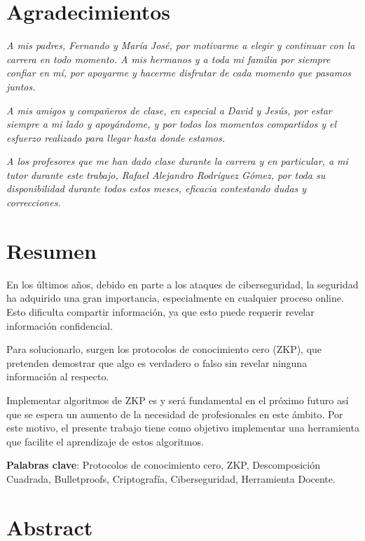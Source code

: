 \chapter*{Agradecimientos}

\begin{flushleft}
    \textit{A mis padres, Fernando y María José, por motivarme a elegir y continuar con la carrera en todo momento. A mis hermanos y a toda mi familia por siempre confiar en mí, por apoyarme y hacerme disfrutar de cada momento que pasamos juntos.}

    \textit{A mis amigos y compañeros de clase, en especial a David y Jesús, por estar siempre a mi lado y apoyándome, y por todos los momentos compartidos y el esfuerzo realizado para llegar hasta donde estamos.}

    \textit{A los profesores que me han dado clase durante la carrera y en particular, a mi tutor durante este trabajo, Rafael Alejandro Rodríguez Gómez, por toda su disponibilidad durante todos estos meses, eficacia contestando dudas y correcciones.}
\end{flushleft}

\blankpage

\chapter*{Resumen}

En los últimos años, debido en parte a los ataques de ciberseguridad, la seguridad ha adquirido una gran importancia, especialmente en cualquier proceso online. Esto dificulta compartir información, ya que esto puede requerir revelar información confidencial.

Para solucionarlo, surgen los protocolos de conocimiento cero (ZKP), que pretenden demostrar que algo es verdadero o falso sin revelar ninguna información al respecto.

Implementar algoritmos de ZKP es y será fundamental en el próximo futuro así que se espera un aumento de la necesidad de profesionales en este ámbito. Por este motivo, el presente trabajo tiene como objetivo implementar una herramienta que facilite el aprendizaje de estos algoritmos.

\vfill

\textbf{Palabras clave}: Protocolos de conocimiento cero, ZKP, Descomposición Cuadrada, Bulletproofs, Criptografía, Ciberseguridad, Herramienta Docente.

\blankpage

\chapter*{Abstract}

